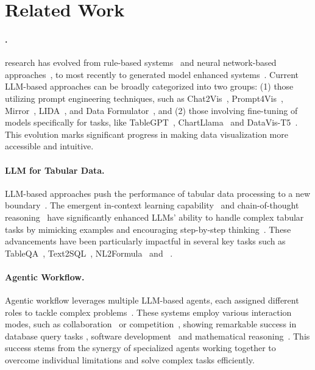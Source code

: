 \section{Related Work}
\label{related}

\paragraph{\nlvis.}
\nlvis research has evolved from rule-based systems~\citep{nl4dv,orko,flowsense,datatone,deepeye} and neural network-based approaches~\citep{advisor,seq2vis,rgvisnet}, to most recently to generated model enhanced systems~\citep{hong2024data}. 
Current LLM-based approaches can be broadly categorized into two groups: (1) those utilizing prompt engineering techniques, such as Chat2Vis~\citep{chat2vis}, Prompt4Vis~\citep{prompt4vis}, Mirror~\citep{mirror}, LIDA~\citep{lida}, and Data Formulator~\citep{formulator}, and (2) those involving fine-tuning of models specifically for \nlvis tasks, like TableGPT~\citep{tablegpt,tablegpt2}, ChartLlama~\citep{chartllama} and DataVis-T5~\citep{datavist5}. This evolution marks significant progress in making data visualization more accessible and intuitive.

\paragraph{LLM for Tabular Data.}
LLM-based approaches push the performance of tabular data processing to a new boundary~\citep{sqlsurvey}. The emergent in-context learning capability~\citep{icl} and chain-of-thought reasoning~\citep{cot} have significantly enhanced LLMs' ability to handle complex tabular tasks by mimicking examples and encouraging step-by-step thinking~\citep{rethinking,cotautomatic,wu2024tablebench}. These advancements have been particularly impactful in several key tasks such as TableQA~\citep{qiu2024tqa,xu2024llasalargelanguagestructured}, Text2SQL~\citep{rbsql,dinsql}, NL2Formula~\citep{nl2formula} and \nlvis~\citep{cotvis,prompt4vis,chartgpt}. %

\paragraph{Agentic Workflow.}
Agentic workflow leverages multiple LLM-based agents, each assigned different roles to tackle complex problems~\citep{multi}. These systems employ various interaction modes, such as collaboration~\citep{chateval,li2023camel,wu2023autogen} or competition~\citep{zhao2023competeai}, showing remarkable success in database query tasks \citep{macsql,zhu2024autotqa,cen2024sqlfixagent}, software development~\citep{metagpt,mapcoder,agentcoder} and mathematical reasoning~\citep{magicore}. This success stems from the synergy of specialized agents working together to overcome individual limitations and solve complex tasks efficiently.
